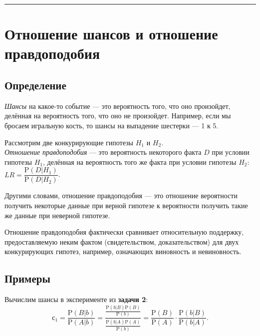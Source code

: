 \documentclass[11pt,a4paper]{article}
\begin{document}
    \begin{center}\rule{0.5\linewidth}{0.5pt}\end{center}

    \hypertarget{ux43eux442ux43dux43eux448ux435ux43dux438ux435-ux448ux430ux43dux441ux43eux432-ux43eux442ux43dux43eux448ux435ux43dux438ux435-ux43fux440ux430ux432ux434ux43eux43fux43eux434ux43eux431ux438ux44f}{%
\section{Отношение шансов и отношение
правдоподобия}\label{ux43eux442ux43dux43eux448ux435ux43dux438ux435-ux448ux430ux43dux441ux43eux432-ux43eux442ux43dux43eux448ux435ux43dux438ux435-ux43fux440ux430ux432ux434ux43eux43fux43eux434ux43eux431ux438ux44f}}

    \hypertarget{ux43eux43fux440ux435ux434ux435ux43bux435ux43dux438ux435}{%
\subsection{Определение}\label{ux43eux43fux440ux435ux434ux435ux43bux435ux43dux438ux435}}
\emph{Шансы} на какое-то событие --- это вероятность того, что оно
произойдет, делённая на вероятность того, что оно не произойдет.
Например, если мы бросаем игральную кость, то шансы на выпадение
шестерки --- 1 к 5.

Рассмотрим две конкурирующие гипотезы \(H_1\) и \(H_2\).\\
\emph{Отношение правдоподобия} --- это вероятность некоторого факта
\(D\) при условии гипотезы \(H_1\), делённая на вероятность того же
факта при условии гипотезы \(H_2\):
\(LR = \dfrac{\mathrm{P}(D|H_1)}{\mathrm{P}(D|H_2)}\).

Другими словами, отношение правдоподобия --- это отношение вероятности
получить некоторые данные при верной гипотезе к вероятности получить
такие же данные при неверной гипотезе.

Отношение правдоподобия фактически сравнивает относительную поддержку,
предоставляемую неким фактом (свидетельством, доказательством) для двух
конкурирующих гипотез, например, означающих виновность и невиновность.

    \hypertarget{ux43fux440ux438ux43cux435ux440ux44b}{%
\subsection{Примеры}\label{ux43fux440ux438ux43cux435ux440ux44b}}

Вычислим шансы в эксперименте из \textbf{задачи 2}: \[
  с_1 = \dfrac{\mathrm{P}(B|b)}{\mathrm{P}(A|b)} = \dfrac{\frac{\mathrm{P}(b|B)\mathrm{P}(B)}{\mathrm{P}(b)}} {\frac{\mathrm{P}(b|A)\mathrm{P}(A)}{\mathrm{P}(b)}} = \frac{\mathrm{P}(B)}{\mathrm{P}(A)} \cdot \dfrac{\mathrm{P}(b|B)}{\mathrm{P}(b|A)}. \tag{3}\label{eq:chances} 
\]
\end{document}

